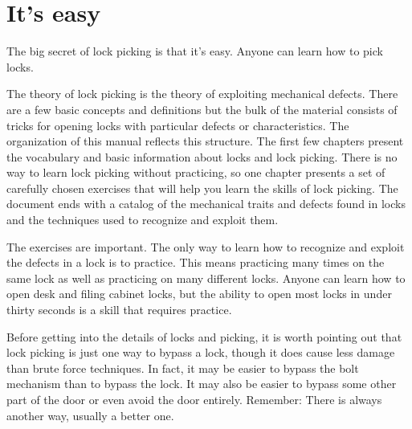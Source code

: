 \chapter{It's easy}
The big secret of lock picking is that it's easy. Anyone can learn how to pick locks.

The theory of lock picking is the theory of exploiting mechanical defects.
There are a few basic concepts and definitions but the bulk of the material consists of tricks for opening locks with particular defects or characteristics.
The organization of this manual reflects this structure.
The first few chapters present the vocabulary and basic information about locks and lock picking.
There is no way to learn lock picking without practicing, so one chapter presents a set of carefully chosen exercises that will help you learn the skills of lock picking.
The document ends with a catalog of the mechanical traits and defects found in locks and the techniques used to recognize and exploit them.

The exercises are important.
The only way to learn how to recognize and exploit the defects in a lock is to practice.
This means practicing many times on the same lock as well as practicing on many different locks.
Anyone can learn how to open desk and filing cabinet locks, but the ability to open most locks in under thirty seconds is a skill that requires practice.

Before getting into the details of locks and picking, it is worth pointing out that lock picking is just one way to bypass a lock, though it does cause less damage than brute force techniques.
In fact, it may be easier to bypass the bolt mechanism than to bypass the lock.
It may also be easier to bypass some other part of the door or even avoid the door entirely.
Remember: There is always another way, usually a better one.
